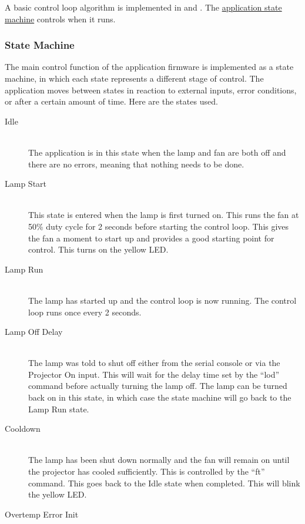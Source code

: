 \documentclass{article}
\begin{document}
A basic control loop algorithm is implemented in  and
.  The \hyperref[sssec:FWAppStateMachine]{application state machine} controls when
it runs.

\subsubsection{State Machine} \label{sssec:FWAppStateMachine}
The main control function of the application firmware is implemented as a state machine, in which
each state represents a different stage of control.  The application moves between states in
reaction to external inputs, error conditions, or after a certain amount of time.  Here are the
states used.

\begin{description}
  \item[Idle] \hfill \\
    The application is in this state when the lamp and fan are both off and there are no errors,
    meaning that nothing needs to be done.
  \item[Lamp Start] \hfill \\
    This state is entered when the lamp is first turned on.  This runs the fan at 50\% duty cycle
    for 2 seconds before starting the control loop.  This gives the fan a moment to start up and
    provides a good starting point for control.  This turns on the yellow LED.
  \item[Lamp Run] \hfill \\
    The lamp has started up and the control loop is now running.  The control loop runs once every 2
    seconds.
  \item[Lamp Off Delay] \hfill \\
    The lamp was told to shut off either from the serial console or via the Projector On input.
    This will wait for the delay time set by the ``lod'' command before actually turning the lamp
    off.  The lamp can be turned back on in this state, in which case the state machine will go back
    to the Lamp Run state.
  \item[Cooldown] \hfill \\
    The lamp has been shut down normally and the fan will remain on until the projector has cooled
    sufficiently.  This is controlled by the ``ft'' command.  This goes back to the Idle state when
    completed.  This will blink the yellow LED.
  \item[Overtemp Error Init] \hfill \\

\end{description}
\end{document}
